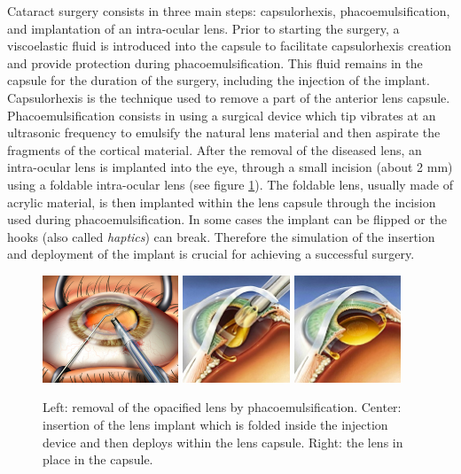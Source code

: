 \documentclass{llncs}
\begin{document}
Cataract surgery consists in three main steps: capsulorhexis, phacoemulsification, and implantation of an intra-ocular lens. Prior to starting the surgery, a viscoelastic fluid is introduced into the capsule to facilitate capsulorhexis creation and provide protection during phacoemulsification. This fluid remains in the capsule for the duration of the surgery, including the injection of the implant. Capsulorhexis is the technique used to remove a part of the anterior lens capsule. Phacoemulsification consists in using a surgical device which tip vibrates at an ultrasonic frequency to emulsify the natural lens material and then aspirate the  fragments of the cortical material. After the removal of the diseased lens, an intra-ocular lens is implanted into the eye, through a small incision (about 2 mm) using a foldable intra-ocular lens (see figure \ref{fig-surgery}). The foldable lens, usually made of acrylic material, is then implanted within the lens capsule through the incision used during phacoemulsification. In some cases the implant can be flipped or  the hooks (also called \emph{haptics}) can break. Therefore the simulation of the insertion and deployment of the implant is crucial for achieving a successful surgery.

\begin{figure}[h]
\begin{center}
\includegraphics[height=3.2cm]{images/suction}
\hfill
\includegraphics[height=3.2cm]{images/implant_injection_step_1}
\hfill
\includegraphics[height=3.2cm]{images/implant_injection_step_2}
\caption [Cataract surgery] {Left: removal of the opacified lens by phacoemulsification. Center: insertion of the lens implant which is folded inside the injection device and then deploys within the lens capsule. Right: the lens in place in the capsule.}
\label{fig-surgery}
\end{center}
\end{figure}
\end{document}
